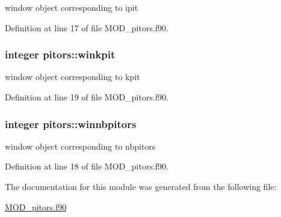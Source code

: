 window object corresponding to ipit 



Definition at line 17 of file M\-O\-D\-\_\-pitors.\-f90.

\hypertarget{classpitors_a619eb0d57818f9db1b52cd36abb7f774}{
\subsubsection[{winkpit}]{\setlength{\rightskip}{0pt plus 5cm}integer pitors\-::winkpit}}\label{classpitors_a619eb0d57818f9db1b52cd36abb7f774}


window object corresponding to kpit 



Definition at line 19 of file M\-O\-D\-\_\-pitors.\-f90.

\hypertarget{classpitors_a0f241a8dfb37f5d7a9222c1ea95f28fc}{
\subsubsection[{winnbpitors}]{\setlength{\rightskip}{0pt plus 5cm}integer pitors\-::winnbpitors}}\label{classpitors_a0f241a8dfb37f5d7a9222c1ea95f28fc}


window object corresponding to nbpitors 



Definition at line 18 of file M\-O\-D\-\_\-pitors.\-f90.



The documentation for this module was generated from the following file\-:\begin{DoxyCompactItemize}
\item 
\hyperlink{MOD__pitors_8f90}{M\-O\-D\-\_\-pitors.\-f90}\end{DoxyCompactItemize}
